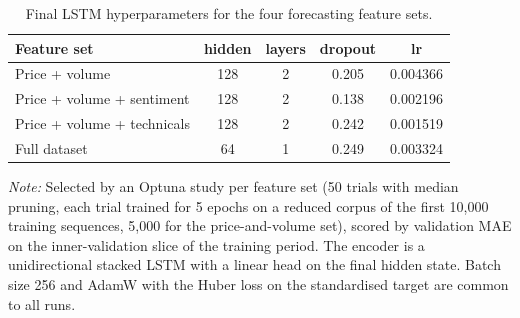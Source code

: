 \begin{table}[ht]
\footnotesize
\centering
\begin{threeparttable}
\caption{Final LSTM hyperparameters for the four forecasting feature sets.}
\label{tab:lstm_hparams}
\renewcommand{\arraystretch}{1.15}
\setlength{\tabcolsep}{6pt}
\begin{tabular}{lcccc}
\toprule
\textbf{Feature set} & \textbf{hidden} & \textbf{layers} & \textbf{dropout} & \textbf{lr} \\
\midrule
Price + volume & 128 & 2 & 0.205 & 0.004366 \\
Price + volume + sentiment & 128 & 2 & 0.138 & 0.002196 \\
Price + volume + technicals & 128 & 2 & 0.242 & 0.001519 \\
Full dataset & 64 & 1 & 0.249 & 0.003324 \\
\bottomrule
\end{tabular}
\begin{tablenotes}[flushleft]
\footnotesize
\item \textit{Note:} Selected by an Optuna study per feature set (50 trials with median pruning, each trial trained for 5 epochs on a reduced corpus of the first 10,000 training sequences, 5,000 for the price-and-volume set), scored by validation MAE on the inner-validation slice of the training period. The encoder is a unidirectional stacked LSTM with a linear head on the final hidden state. Batch size 256 and AdamW with the Huber loss on the standardised target are common to all runs.
\end{tablenotes}
\end{threeparttable}
\end{table}